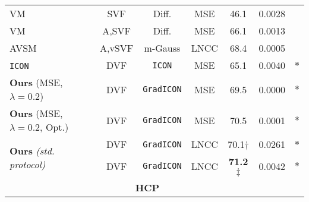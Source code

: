 \begin{table*}[b]
\begin{small}
\begin{tabular}{lcccccc}
			VM~\cite{balakrishnan2019voxelmorph}                  & SVF                     & Diff.                                 & MSE         & 46.1\resTS                 & 0.0028            & ~\cite{shen2019networks}         \\
			VM~\cite{balakrishnan2019voxelmorph}                  & A,SVF                   & Diff.                                 & MSE         & 66.1\resTS                 & 0.0013            & ~\cite{shen2019networks}         \\ %
			AVSM~\cite{shen2019networks}                          & A,vSVF                  & m-Gauss                               & LNCC        & 68.4\resTS                 & 0.0005            & ~\cite{shen2019networks}         \\ %
			\texttt{ICON}~\cite{greer2021icon}                    & DVF                     & \texttt{ICON}                         & MSE         & 65.1\resTS                 & 0.0040            & $\ast$                           \\ %
			{\textbf{Ours} (MSE, $\lambda{=}0.2$)}                & DVF                     & \cellcolor{black!10}\texttt{GradICON} & MSE         & 69.5\resTS                 & 0.0000            & $\ast$                           \\ %
			{\textbf{Ours} (MSE, $\lambda{=}0.2$, Opt.)}          & DVF                     & \cellcolor{black!10}\texttt{GradICON} & MSE         & 70.5\resTS                 & 0.0001            & $\ast$                           \\ %
			\multirow{2}{*}{\textbf{Ours} \emph{(std. protocol)}} & DVF                     & \cellcolor{black!10}\texttt{GradICON} & LNCC        & 70.1$\dagger$              & 0.0261            & $\ast$                           \\ %
			                                                      & DVF                     & \cellcolor{black!10}\texttt{GradICON} & LNCC        & {\bf 71.2}$\ddagger$       & 0.0042            & $\ast$                           \\
			\midrule
			\multicolumn{6}{c}{\bf HCP}                                                                                                                                                                                               \\

\end{tabular}
\end{small}
\end{table*}
